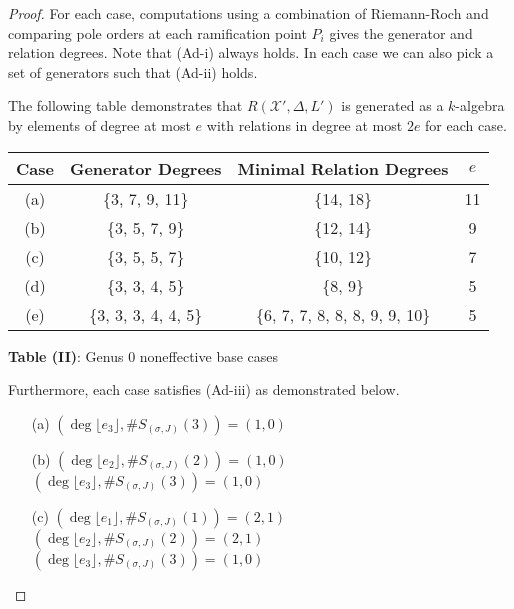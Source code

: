 \documentclass{amsart}
\theoremstyle{plain}
\theoremstyle{definition}
\theoremstyle{remark}
\numberwithin{equation}{section}
\newcommand \sx{\mathscr X}
\begin{document}
\begin{proof}
For each case, computations using a combination of Riemann-Roch and
comparing pole orders at each ramification point $P_i$ gives the
generator and relation degrees. Note that (Ad-i) always holds.
In each case we can also pick a set of generators such that
(Ad-ii) holds. 

The following table demonstrates that $R(\sx', \Delta, L')$ is
generated as a $k$-algebra by elements of degree at most $e$
with relations in degree at most $2e$ for each case.

\begin{longtable}
	{| c || c | c | c |}
	\hline
	Case & Generator Degrees & Minimal Relation Degrees & $e$\\
	\hline
	\hline

	(a) & \{3, 7, 9, 11\} & \{14, 18\} & 11\\	\hline

	(b) & \{3, 5, 7, 9\} & \{12, 14\}	& 9\\ \hline

	(c) & \{3, 5, 5, 7\} & \{10, 12\}	& 7\\ \hline

	(d) & \{3, 3, 4, 5\} & \{8,	9\} & 5\\ \hline

	(e) & \{3, 3, 3, 4,	4, 5\} & \{6, 7, 7, 8, 8, 8, 9, 9, 10\} & 5\\ \hline
\end{longtable}

\begin{center}
\textbf{Table (II)}: Genus 0 noneffective base cases
\end{center}

Furthermore, each case satisfies (Ad-iii) as demonstrated below.

\begin{enumerate}
	\item[(a)] $(\deg \lfloor e_3 \rfloor, \# S_{(\sigma, J)}(3)) = (1, 0)$

	\item[(b)] $(\deg \lfloor e_2 \rfloor, \#S_{(\sigma, J)}(2)) = (1, 0)$ \\
		$(\deg \lfloor e_3 \rfloor, \#S_{(\sigma, J)}(3)) = (1, 0)$

	\item[(c)] $(\deg \lfloor e_1 \rfloor, \#S_{(\sigma, J)}(1)) = (2, 1)$ \\
		$(\deg \lfloor e_2 \rfloor, \#S_{(\sigma, J)}(2)) = (2, 1)$ \\
		$(\deg \lfloor e_3 \rfloor, \#S_{(\sigma, J)}(3)) = (1, 0)$


\end{enumerate}
\end{proof}
\end{document}
